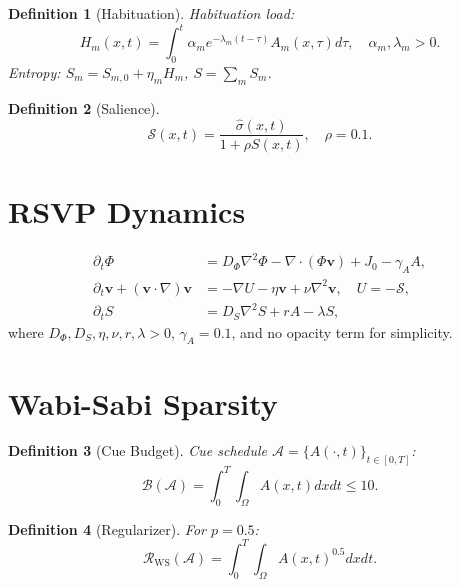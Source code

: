 \documentclass[openany]{book}
\newtheorem{definition}{Definition}[chapter]
\newcommand{\PhiS}{\Phi} %
\newcommand{\vvec}{\mathbf{v}} %
\newcommand{\Sent}{S} %
\begin{document}
{{{{{{{{{{{{\begin{definition}[Habituation]
Habituation load:
\begin{equation}
\label{eq:habituation}
H_m(x,t) = \int_{0}^{t} \alpha_m e^{-\lambda_m (t-\tau)} A_m(x,\tau) d\tau, \quad \alpha_m, \lambda_m > 0.
\end{equation}
Entropy: \(\Sent_m = S_{m,0} + \eta_m H_m\), \(\Sent = \sum_m \Sent_m\).
\end{definition}

\begin{definition}[Salience]
\begin{equation}
\label{eq:entropy-suppress}
\mathcal{S}(x,t) = \frac{\widehat{\sigma}(x,t)}{1 + \rho \Sent(x,t)}, \quad \rho = 0.1.
\end{equation}
\end{definition}

\section{RSVP Dynamics}
\label{sec:rsvp-dynamics}
\begin{align}
\partial_t \PhiS &= D_\Phi \nabla^2 \PhiS - \nabla \cdot (\PhiS \vvec) + J_0 - \gamma_A A, \label{eq:phi} \\
\partial_t \vvec + (\vvec \cdot \nabla)\vvec &= -\nabla U - \eta \vvec + \nu \nabla^2 \vvec, \quad U = -\mathcal{S}, \label{eq:v} \\
\partial_t \Sent &= D_S \nabla^2 \Sent + r A - \lambda \Sent, \label{eq:S}
\end{align}
where \(D_\Phi, D_S, \eta, \nu, r, \lambda > 0\), \(\gamma_A = 0.1\), and no opacity term for simplicity.

\section{Wabi-Sabi Sparsity}
\label{sec:rsvp-wabisabi}
\begin{definition}[Cue Budget]
Cue schedule \(\mathcal{A} = \{A(\cdot,t)\}_{t \in [0,T]}\):
\begin{equation}
\label{eq:budget}
\mathcal{B}(\mathcal{A}) = \int_{0}^{T} \int_{\Omega} A(x,t) dx dt \leq 10.
\end{equation}
\end{definition}

\begin{definition}[Regularizer]
For \(p = 0.5\):
\begin{equation}
\label{eq:ws-reg}
\mathcal{R}_{\mathrm{WS}}(\mathcal{A}) = \int_{0}^{T} \int_{\Omega} A(x,t)^{0.5} dx dt.
\end{equation}
\end{definition}

}}}}}}}}}}}}
\end{document}
